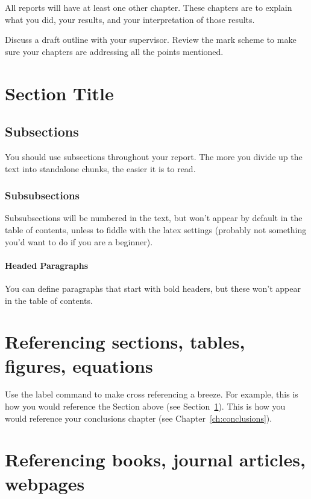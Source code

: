 All reports will have at least one other chapter. These chapters are to explain what you did, your results, and your interpretation of those results. 

Discuss a draft outline with your supervisor. Review the mark scheme to make sure your chapters are addressing all the points mentioned.


\section{Section Title}
\label{sec:nameofsection}

\subsection{Subsections}

You should use subsections throughout your report. The more you divide up the text into standalone chunks, the easier it is to read.

\subsubsection{Subsubsections}

Subsubsections will be numbered in the text, but won't appear by default in the table of contents, unless to fiddle with the latex settings (probably not something you'd want to do if you are a beginner).

\paragraph{Headed Paragraphs} You can define paragraphs that start with bold headers, but these won't appear in the table of contents. 


\section{Referencing sections, tables, figures, equations}
Use the label command to make cross referencing a breeze. For example, this is how you would reference the Section above (see Section~\ref{sec:nameofsection}). This is how you would reference your conclusions chapter (see Chapter~\ref{ch:conclusions}).

\section{Referencing books, journal articles, webpages}

